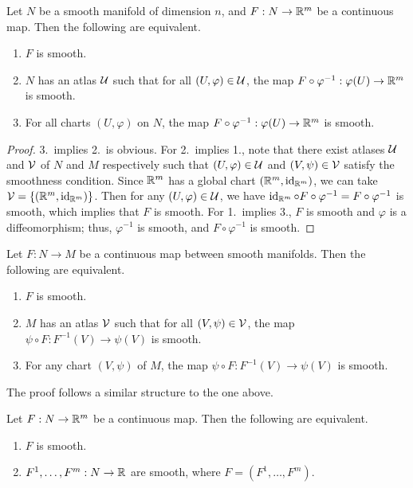 \begin{proposition}
    Let $N$ be a smooth manifold of dimension $n$, and $F:N \to \mathbb{R}^{m}$ be a continuous map. Then the following are equivalent.
    \begin{enumerate}
        \item $F$ is smooth.
        \item $N$ has an atlas $\mathcal{U}$ such that for all $(U,\varphi) \in \mathcal{U}$, the map $F \circ \varphi^{-1}:\varphi(U) \to \mathbb{R}^{m}$ is smooth.
        \item For all charts $(U,\varphi)$ on $N$, the map $F \circ \varphi^{-1}:\varphi(U) \to \mathbb{R}^{m}$ is smooth.
    \end{enumerate}
\end{proposition}
\begin{proof}
    3.~implies 2.~is obvious. For 2.~implies 1., note that there exist atlases $\mathcal{U}$ and $\mathcal{V}$ of $N$ and $M$ respectively such that $(U,\varphi) \in \mathcal{U}$ and $(V,\psi) \in \mathcal{V}$ satisfy the smoothness condition. Since $\mathbb{R}^{m}$ has a global chart $(\mathbb{R}^{m},\operatorname{id}_{\mathbb{R}^{m}})$, we can take $\mathcal{V} = \{(\mathbb{R}^{m},\operatorname{id}_{\mathbb{R}^{m}})\}$. Then for any $(U,\varphi) \in \mathcal{U}$, we have $\operatorname{id}_{\mathbb{R}^{m}} \circ F \circ \varphi^{-1} = F \circ \varphi^{-1}$ is smooth, which implies that $F$ is smooth. For 1.~implies 3., $F$ is smooth and $\varphi$ is a diffeomorphism; thus, $\varphi^{-1}$ is smooth, and $F \circ \varphi^{-1}$ is smooth.
\end{proof}

\begin{proposition}
    Let $F:N \to M$ be a continuous map between smooth manifolds. Then the following are equivalent.
    \begin{enumerate}
        \item $F$ is smooth.
        \item $M$ has an atlas $\mathcal{V}$ such that for all $(V,\psi) \in \mathcal{V}$, the map $\psi \circ F:F^{-1}(V) \to \psi(V)$ is smooth.
        \item For any chart $(V,\psi)$ of $M$, the map $\psi \circ F:F^{-1}(V) \to \psi(V)$ is smooth.
    \end{enumerate}
\end{proposition}
The proof follows a similar structure to the one above.

\begin{proposition}
    Let $F:N \to \mathbb{R}^{m}$ be a continuous map. Then the following are equivalent.
    \begin{enumerate}
        \item $F$ is smooth.
        \item $F^{1},\ldots,F^{m}:N \to \mathbb{R}$ are smooth, where $F = (F^{1},\ldots,F^{m})$.
    \end{enumerate}
\end{proposition}

